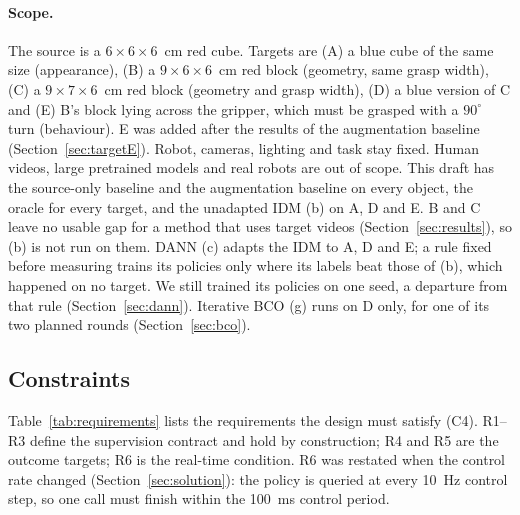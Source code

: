 \documentclass{article}
\begin{document}
\paragraph{Scope.}
The source is a $6 \times 6 \times 6$~cm red cube. Targets are (A) a blue cube of the
same size (appearance), (B) a $9 \times 6 \times 6$~cm red block (geometry, same grasp
width), (C) a $9 \times 7 \times 6$~cm red block (geometry and grasp width), (D) a blue
version of C and (E) B's block lying across the gripper, which must be grasped with a
$90^\circ$ turn (behaviour). E was added after the results of the augmentation baseline
(Section~\ref{sec:targetE}). Robot, cameras, lighting and task stay fixed. Human videos,
large pretrained models and real robots are out of scope. This draft has the source-only
baseline and the augmentation baseline on every object, the oracle for every target, and
the unadapted IDM (b) on A, D and E. B and C leave no usable gap for a method that uses
target videos (Section~\ref{sec:results}), so (b) is not run on them. DANN (c) adapts the
IDM to A, D and E; a rule fixed before measuring trains its policies only where its labels
beat those of (b), which happened on no target. We still trained its policies on one seed,
a departure from that rule (Section~\ref{sec:dann}). Iterative BCO (g) runs on D only, for
one of its two planned rounds (Section~\ref{sec:bco}).

\subsection{Constraints}
Table~\ref{tab:requirements} lists the requirements the design must satisfy (C4). R1--R3
define the supervision contract and hold by construction; R4 and R5 are the outcome
targets; R6 is the real-time condition. R6 was restated when the control rate changed
(Section~\ref{sec:solution}): the policy is queried at every 10~Hz control step, so one
call must finish within the 100~ms control period.
\end{document}
